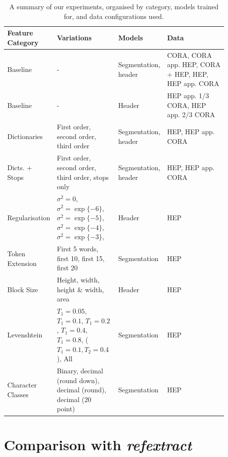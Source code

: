 \begin{table}[h]
\begin{center}
\begin{tabular}{ | p{0.2\linewidth} | p{0.25\linewidth} | p{0.15\linewidth} | p{0.3\linewidth} |}
\hline
Feature Category & Variations & Models & Data\\
\hline
Baseline & - & Segmentation, header & CORA, CORA app. HEP, CORA + HEP, HEP, HEP app. CORA \\
\hline
Baseline & - & Header & HEP app. 1/3 CORA, HEP app. 2/3 CORA \\
\hline
Dictionaries & First order, second order, third order & Segmentation, header & HEP, HEP app. CORA \\
\hline
Dicts. + Stops & First order, second order, third order, stops only & Segmentation, header & HEP, HEP app. CORA \\
\hline
Regularisation & $\sigma^2=0$, $\sigma^2=\exp\{-6\}$, $\sigma^2=\exp\{-5\}$, $\sigma^2=\exp\{-4\}$, $\sigma^2=\exp\{-3\}$, & Header & HEP \\
\hline
Token Extension & First 5 words, first 10, first 15, first 20 & Segmentation & HEP \\
\hline
Block Size & Height, width, height \& width, area & Header & HEP \\
\hline
Levenshtein & $T_1 = 0.05$, $T_1 = 0.1$, $T_1 = 0.2$, $T_1 = 0.4$, $T_1 = 0.8$, ($T_1 = 0.1, T_2 = 0.4$), All & Segmentation & HEP \\
\hline
Character Classes & Binary, decimal (round down), decimal (round), decimal (20 point) & Segmentation & HEP \\
\hline
\end{tabular}
\caption[A summary of our experiments, organised by category, models trained for, and data configurations used.]{A summary of our experiments, organised by category, models trained for, and data configurations used.}
\label{table:experiments}
\end{center}
\end{table}

\section{Comparison with \emph{refextract}}
\label{sec:refextract}

